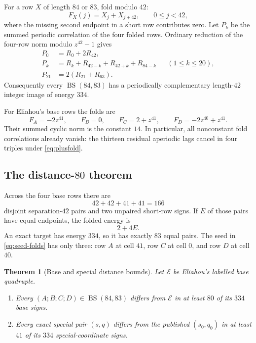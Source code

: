 \documentclass[11pt]{article}
\newtheorem{theorem}{Theorem}[section]
\theoremstyle{remark}
\newcommand{\BS}{\operatorname{BS}}
\begin{document}
For a row $X$ of length $84$ or $83$, fold modulo $42$:
\[
 F_X(j)=X_j+X_{j+42},\qquad 0\leq j<42,
\]
where the missing second endpoint in a short row contributes zero.
Let $P_k$ be the summed periodic correlation of the four folded rows.
Ordinary reduction of the four-row norm modulo $z^{42}-1$ gives
\begin{align}
 P_0&=R_0+2R_{42},\nonumber\\
 P_k&=R_k+R_{42-k}+R_{42+k}+R_{84-k}
       &&(1\leq k\leq20),\label{eq:plusfold}\\
 P_{21}&=2(R_{21}+R_{63}).\nonumber
\end{align}
Consequently every $\BS(84,83)$ has a periodically complementary
length-$42$ integer image of energy $334$.

For Eliahou's base rows the folds are
\begin{equation}
 F_A=-2z^{41},\qquad F_B=0,\qquad
 F_C=2+z^{41},\qquad F_D=-2z^{40}+z^{41}.        \label{eq:seed-folds}
\end{equation}
Their summed cyclic norm is the constant $14$.  In particular, all
nonconstant fold correlations already vanish: the thirteen residual
aperiodic lags cancel in four triples under \eqref{eq:plusfold}.

\subsection{The distance-\texorpdfstring{$80$}{80} theorem}

Across the four base rows there are
\[
 42+42+41+41=166
\]
disjoint separation-$42$ pairs and two unpaired short-row signs.  If $E$
of those pairs have equal endpoints, the folded energy is
\begin{equation}
 2+4E.                                               \label{eq:fold-energy}
\end{equation}
An exact target has energy $334$, so it has exactly $83$ equal pairs.
The seed in \eqref{eq:seed-folds} has only three: row $A$ at cell $41$,
row $C$ at cell $0$, and row $D$ at cell $40$.

\begin{theorem}[Base and special distance bounds]\label{thm:distance}
Let $\mathcal E$ be Eliahou's labelled base quadruple.
\begin{enumerate}
  \item Every $(A;B;C;D)\in\BS(84,83)$ differs from $\mathcal E$ in at
        least $80$ of its $334$ base signs.
  \item Every exact special pair $(s,q)$ differs from the published
        $(s_0,q_0)$ in at least $41$ of its $334$ special-coordinate
        signs.
\end{enumerate}
\end{theorem}
\end{document}
